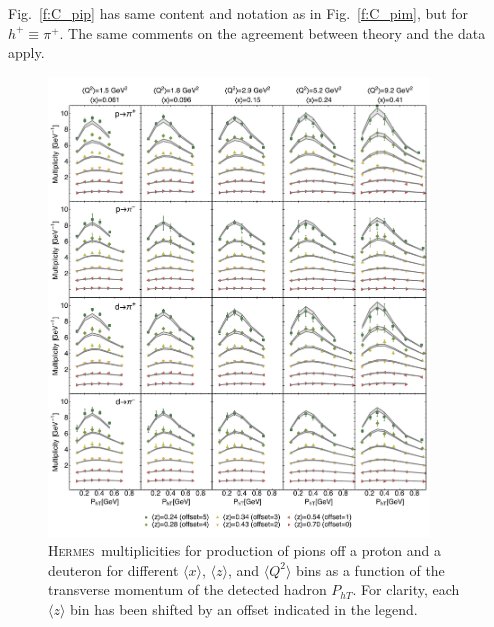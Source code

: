 \documentclass[aps,preprintnumbers,showpacs,nofootinbib,superscriptaddress,floatfix]{revtex4}
\newcommand{\hermes}{\textsc{Hermes}}
\begin{document}
Fig.~\ref{f:C_pip} has same content and notation as in Fig.~\ref{f:C_pim}, but
for $h^+ \equiv \pi^+$. The same comments on the agreement between theory and
the data apply. 
\begin{figure}[h!]
\begin{center}
\includegraphics[width=0.90\textwidth]{plots/Hermes_Pions_SCIplot_flINDEP.pdf}
\end{center}
\caption{\hermes\ multiplicities for production of pions off a proton and a deuteron for different $\langle x \rangle$, $\langle z \rangle$, and $\langle Q^2 \rangle$ bins as a function of the transverse momentum of the detected hadron  $P_{hT}$. For clarity, each $\langle z \rangle$  bin has been shifted by an offset indicated in the legend.} 
\label{f:H_pions}
\end{figure}
\end{document}
